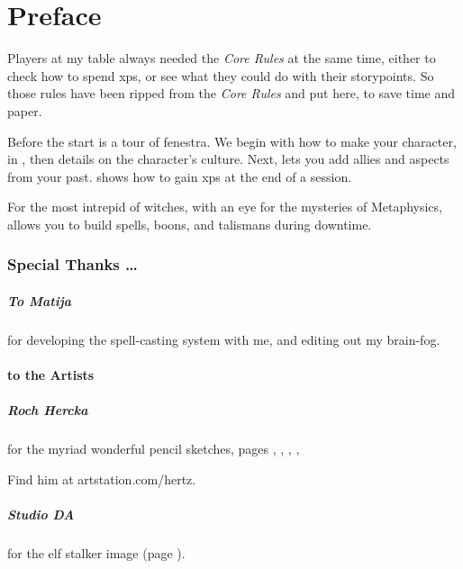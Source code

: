 \chapter{Preface}

\begin{multicols}{2}

\noindent
Players at my table always needed the \textit{Core Rules} at the same time, either to check how to spend \glspl{xp}, or see what they could do with their \glspl{storypoint}.
So those rules have been ripped from the \textit{Core Rules} and put here, to save time and paper.

Before the start is a tour of \gls{fenestra}.
We begin with how to make your character, in , then details on the character's culture.
Next,  lets you add allies and aspects from your past.
 shows how to gain \glspl{xp} at the end of a session.

For the most intrepid of witches, with an eye for the mysteries of Metaphysics,  allows you to build spells, \glspl{boon}, and \glspl{talisman} during \gls{downtime}.

\subsection*{Special Thanks \ldots}

\paragraph{To Matija}
for developing the spell-casting system with me, and editing out my brain-fog.

\subsubsection*{to the Artists}

\paragraph{Roch Hercka} for the myriad wonderful pencil sketches, pages 
\pageref{Roch_Hercka/five_races}, 
\pageref{Roch_Hercka/illusion_trogdor}, 
\pageref{Roch_Hercka/xp-1}, 
\pageref{Roch_Hercka/xp-2}, 

Find him at artstation.com/hertz.

\paragraph{Studio DA}
for the elf stalker image
(page \pageref{Studio_DA/elf_stalker}).


\end{multicols}
